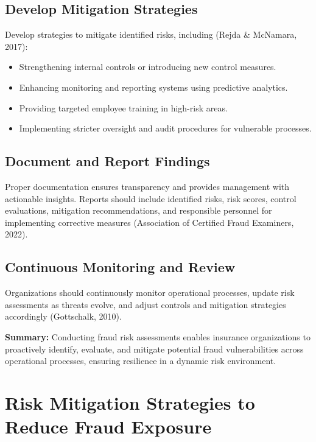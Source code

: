 \documentclass[12pt,a4paper]{article}
\begin{document}
\subsection{Develop Mitigation Strategies}
Develop strategies to mitigate identified risks, including (Rejda \& McNamara, 2017):
\begin{itemize}
    \item Strengthening internal controls or introducing new control measures.
    \item Enhancing monitoring and reporting systems using predictive analytics.
    \item Providing targeted employee training in high-risk areas.
    \item Implementing stricter oversight and audit procedures for vulnerable processes.
\end{itemize}

\subsection{Document and Report Findings}
Proper documentation ensures transparency and provides management with actionable insights. Reports should include identified risks, risk scores, control evaluations, mitigation recommendations, and responsible personnel for implementing corrective measures (Association of Certified Fraud Examiners, 2022).

\subsection{Continuous Monitoring and Review}
Organizations should continuously monitor operational processes, update risk assessments as threats evolve, and adjust controls and mitigation strategies accordingly (Gottschalk, 2010).

\begin{example}
\textbf{Summary:} Conducting fraud risk assessments enables insurance organizations to proactively identify, evaluate, and mitigate potential fraud vulnerabilities across operational processes, ensuring resilience in a dynamic risk environment.
\end{example}

\section{Risk Mitigation Strategies to Reduce Fraud Exposure}
\end{document}
